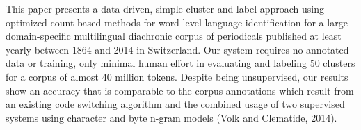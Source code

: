 This paper presents a data-driven, simple cluster-and-label approach using optimized count-based methods for word-level language identification for a large domain-specific multilingual diachronic corpus of periodicals published at least yearly between 1864 and 2014 in Switzerland. Our system requires no annotated data or training, only minimal human effort in evaluating and labeling 50 clusters for a corpus of almost 40 million tokens. Despite being unsupervised, our results show an accuracy that is comparable to the corpus annotations which result from an existing code switching algorithm and the combined usage of two supervised systems using character and byte n-gram models (Volk and Clematide, 2014).
